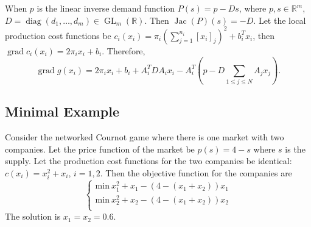 When $p$ is the linear inverse demand function $P(s) = p − Ds$, where $p, s \in \mathbb{R}^m$, $D = \operatorname{diag}(d_1, \ldots, d_m) \in \operatorname{GL}_m(\mathbb{R})$. Then $\operatorname{Jac}(P)(s) = -D$. Let the local production cost functions be $c_i(x_i) = \pi_i \left(\sum\limits_{j=1}^{n_i} [x_i]_j\right)^2 + b_i^Tx_i$, then $\operatorname{grad} c_i(x_i) = 2\pi_i x_i + b_i$. Therefore,
$$
\operatorname{grad} g(x_i) = 2\pi_i x_i + b_i + A_i^TDA_ix_i - A_i^T \left( p - D\sum\limits_{1 \leqslant j \leqslant N} A_jx_j \right).
$$


\subsection*{Minimal Example}

Consider the networked Cournot game where there is one market with two companies. Let the price function of the market be $p(s) = 4 - s$ where $s$ is the supply. Let the production cost functions for the two companies be identical: $c(x_i) = x_i^2 + x_i$, $i = 1, 2$. Then the objective function for the companies are
$$\begin{cases}
\text{min} \ x_1^2 + x_1 - (4 - (x_1 + x_2)) x_1 \\
\text{min} \ x_2^2 + x_2 - (4 - (x_1 + x_2)) x_2 \\
\end{cases}$$
The solution is $x_1 = x_2 = 0.6.$


\printbibliography
